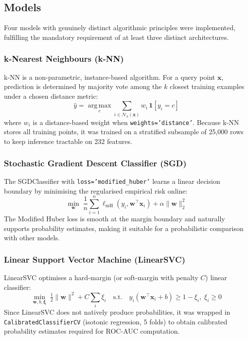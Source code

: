 \documentclass[12pt,a4paper]{article}
\begin{document}
\subsection{Models}

Four models with genuinely distinct algorithmic principles were implemented,
fulfilling the mandatory requirement of at least three distinct architectures.

\subsubsection{k-Nearest Neighbours (k-NN)}

k-NN is a non-parametric, instance-based algorithm. For a query point
$\mathbf{x}$, prediction is determined by majority vote among the $k$ closest
training examples under a chosen distance metric:
\[
  \hat{y} = \underset{c}{\operatorname{arg\,max}}
            \sum_{i \in \mathcal{N}_k(\mathbf{x})} w_i \,\mathbf{1}[y_i = c]
\]
where $w_i$ is a distance-based weight when \texttt{weights='distance'}.
Because k-NN stores all training points, it was trained on a stratified
subsample of 25,000 rows to keep inference tractable on 232 features.

\subsubsection{Stochastic Gradient Descent Classifier (SGD)}

The SGDClassifier with \texttt{loss='modified\_huber'} learns a linear
decision boundary by minimising the regularised empirical risk online:
\[
  \min_{\mathbf{w}} \; \frac{1}{n}\sum_{i=1}^{n} \ell_{\text{mH}}
  (y_i, \mathbf{w}^\top \mathbf{x}_i) + \alpha \|\mathbf{w}\|_2^2
\]
The Modified Huber loss is smooth at the margin boundary and naturally
supports probability estimates, making it suitable for a probabilistic
comparison with other models.

\subsubsection{Linear Support Vector Machine (LinearSVC)}

LinearSVC optimises a hard-margin (or soft-margin with penalty $C$) linear
classifier:
\[
  \min_{\mathbf{w},b,\boldsymbol{\xi}} \;
  \tfrac{1}{2}\|\mathbf{w}\|^2 + C\sum_i \xi_i
  \quad \text{s.t.} \quad
  y_i(\mathbf{w}^\top \mathbf{x}_i + b) \geq 1 - \xi_i,\; \xi_i \geq 0
\]
Since LinearSVC does not natively produce probabilities, it was wrapped in
\texttt{CalibratedClassifierCV} (isotonic regression, 5 folds) to obtain
calibrated probability estimates required for ROC-AUC computation.
\end{document}
